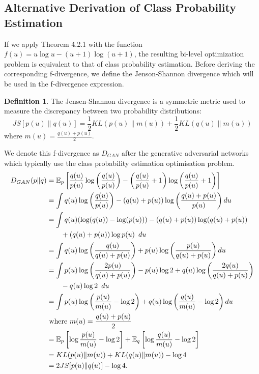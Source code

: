 \documentclass[honours,12pt]{unswthesis}
\newcommand{\E}{\mathbb{E}}
\numberwithin{equation}{section}
\theoremstyle{definition}
\newtheorem{definition}[theorem]{Definition}
\begin{document}
\subsection{Alternative Derivation of Class Probability Estimation}
If we apply Theorem 4.2.1 with the function $f(u)=u\log u-(u+1)\log (u+1)$, the resulting bi-level optimization problem is equivalent to that of class probability estimation\citep{tiao}. Before deriving the corresponding f-divergence, we define the Jenson-Shannon divergence which will be used in the f-divergence expression.
\begin{definition}
The Jensen-Shannon divergence is a symmetric metric used to measure the discrepancy between two probability distributions\citep{JS}:
\[JS[p(u)\|q(u)]=\frac12 KL(p(u)\|m(u))+\frac12 KL(q(u)\|m(u))\]
where $m(u)=\frac{q(u)+p(u)}{2}$.
\end{definition}
We denote this f-divergence as $D_{GAN}$ after the generative adversarial networks which typically use the class probability estimation optimisation problem\citep{gan}.
\begin{align*}
D_{GAN}(p\|q)&= \E_p\left[\frac{q(u)}{p(u)}\log \left(\frac{q(u)}{p(u)}\right)-\left(\frac{q(u)}{p(u)}+1 \right)\log\left(\frac{q(u)}{p(u)}+1\right)\right]\\
&= \int q(u)\log\left(\frac{q(u)}{p(u)}\right)-(q(u)+p(u))\log\left(\frac{q(u)+p(u)}{p(u)}\right)du\\
&= \int q(u)(\log(q(u))-\log(p(u)))-(q(u)+p(u))\log(q(u)+p(u))\\
&\qquad +(q(u)+p(u))\log p(u)\enskip du\\
&= \int q(u)\log\left(\frac{q(u)}{q(u)+p(u)}\right)+p(u)\log \left(\frac{p(u)}{q(u)+p(u)}\right) du\\
&= \int p(u)\log \left(\frac{2p(u)}{q(u)+p(u)}\right)-p(u)\log 2+q(u)\log \left(\frac{2q(u)}{q(u)+p(u)}\right)\\
&\qquad -q(u)\log 2\enskip du\\
&= \int p(u)\log \left(\frac{p(u)}{m(u)}-\log 2\right)+q(u)\log \left(\frac{q(u)}{m(u)}-\log 2\right)du\\
&\text{ where }m(u)=\frac{q(u)+p(u)}{2}\\
&= \E_p \left[\log \frac{p(u)}{m(u)}-\log 2\right]+\E_q\left[\log\frac{q(u)}{m(u)}-\log 2\right]\\
&= KL(p(u)\|m(u))+KL(q(u)\|m(u))-\log 4\\
&= 2JS[p(u)\|q(u)]-\log 4.
\end{align*}
\end{document}
